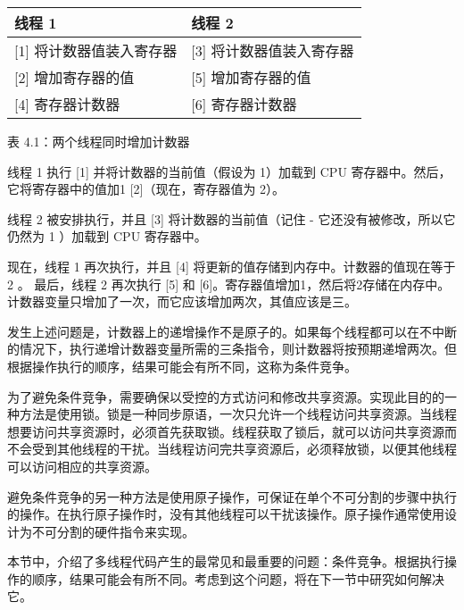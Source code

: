 \begin{longtable}{|l|l|}
\hline
线程 1                          & 线程 2                          \\ \hline
\endfirsthead
%
\endhead
%
{[}1{]} 将计数器值装入寄存器 & {[}3{]} 将计数器值装入寄存器 \\ \hline
{[}2{]} 增加寄存器的值  & {[}5{]} 增加寄存器的值  \\ \hline
{[}4{]} 寄存器计数器 & {[}6{]} 寄存器计数器 \\ \hline
\end{longtable}

\begin{center}
表 4.1：两个线程同时增加计数器
\end{center}

线程 1 执行 [1] 并将计数器的当前值（假设为 1）加载到 CPU 寄存器中。然后，它将寄存器中的值加1 [2]（现在，寄存器值为 2）。

线程 2 被安排执行，并且 [3] 将计数器的当前值（记住 - 它还没有被修改，所以它仍然为 1 ）加载到 CPU 寄存器中。

现在，线程 1 再次执行，并且 [4] 将更新的值存储到内存中。计数器的值现在等于 2 。
最后，线程 2 再次执行 [5] 和 [6]。寄存器值增加1，然后将2存储在内存中。计数器变量只增加了一次，而它应该增加两次，其值应该是三。

发生上述问题是，计数器上的递增操作不是原子的。如果每个线程都可以在不中断的情况下，执行递增计数器变量所需的三条指令，则计数器将按预期递增两次。但根据操作执行的顺序，结果可能会有所不同，这称为条件竞争。

为了避免条件竞争，需要确保以受控的方式访问和修改共享资源。实现此目的的一种方法是使用锁。锁是一种同步原语，一次只允许一个线程访问共享资源。当线程想要访问共享资源时，必须首先获取锁。线程获取了锁后，就可以访问共享资源而不会受到其他线程的干扰。当线程访问完共享资源后，必须释放锁，以便其他线程可以访问相应的共享资源。

避免条件竞争的另一种方法是使用原子操作，可保证在单个不可分割的步骤中执行的操作。在执行原子操作时，没有其他线程可以干扰该操作。原子操作通常使用设计为不可分割的硬件指令来实现。

本节中，介绍了多线程代码产生的最常见和最重要的问题：条件竞争。根据执行操作的顺序，结果可能会有所不同。考虑到这个问题，将在下一节中研究如何解决它。





























